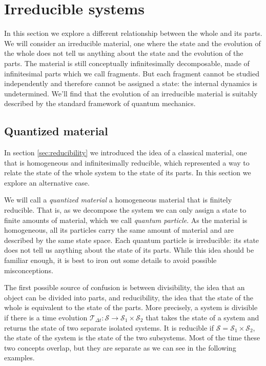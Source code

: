 \documentclass[smallextended]{svjour3}
\numberwithin{equation}{section}
\begin{document}
\section{Irreducible systems}
\label{sec:irreducibility}

In this section we explore a different relationship between the whole and its parts. We will consider an irreducible material, one where the state and the evolution of the whole does not tell us anything about the state and the evolution of the parts. The material is still conceptually infinitesimally decomposable, made of infinitesimal parts which we call fragments. But each fragment cannot be studied independently and therefore cannot be assigned a state: the internal dynamics is undetermined. We'll find that the evolution of an irreducible material is suitably described by the standard framework of quantum mechanics.

\subsection{Quantized material}

In section \ref{sec:reducibility} we introduced the idea of a classical material, one that is homogeneous and infinitesimally reducible, which represented a way to relate the state of the whole system to the state of its parts. In this section we explore an alternative case.

We will call a \emph{quantized material} a homogeneous material that is finitely reducible. That is, as we decompose the system we can only assign a state to finite amounts of material, which we call \emph{quantum particle}. As the material is homogeneous, all its particles carry the same amount of material and are described by the same state space. Each quantum particle is irreducible: its state does not tell us anything about the state of its parts. While this idea should be familiar enough, it is best to iron out some details to avoid possible misconceptions.

The first possible source of confusion is between divisibility, the idea that an object can be divided into parts, and reducibility, the idea that the state of the whole is equivalent to the state of the parts. More precisely, a system is divisible if there is a time evolution $\mathcal{T}_{\Delta t}: \mathcal{S} \rightarrow \mathcal{S}_1 \times \mathcal{S}_2$ that takes the state of a system and returns the state of two separate isolated systems. It is reducible if $\mathcal{S} = \mathcal{S}_1 \times \mathcal{S}_2$, the state of the system is the state of the two subsystems. Most of the time these two concepts overlap, but they are separate as we can see in the following examples.
\end{document}
